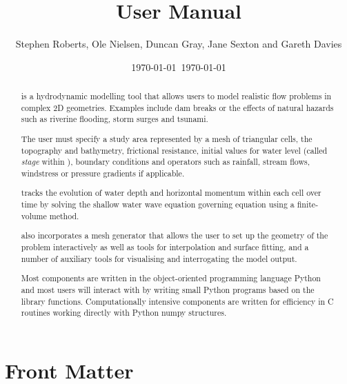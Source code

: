 \documentclass{manual}
\title{\anuga User Manual}
\author{Stephen Roberts, Ole Nielsen, Duncan Gray, Jane Sexton and Gareth Davies}
\date{\today \ \currenttime}
\date{\today} %
\begin{document}
\maketitle

\ifhtml
  \chapter*{Front Matter\label{front}}
\fi

%



\begin{abstract}
\label{def:anuga}

\noindent \anuga\index{\anuga} is a hydrodynamic modelling tool that
allows users to model realistic flow problems in complex 2D geometries.
Examples include dam breaks or the effects of natural hazards such
as riverine flooding, storm surges and tsunami.

The user must specify a study area represented by a mesh of triangular
cells, the topography and bathymetry, frictional resistance, initial
values for water level (called \emph{stage} within \anuga),
boundary conditions and operators such as rainfall, 
stream flows, windstress or pressure gradients if applicable.

\anuga tracks the evolution of water depth and horizontal momentum
within each cell over time by solving the shallow water wave equation
governing equation using a finite-volume method.

\anuga also incorporates a mesh generator that
allows the user to set up the geometry of the problem interactively as
well as tools for interpolation and surface fitting, and a number of
auxiliary tools for visualising and interrogating the model output.

Most \anuga components are written in the object-oriented programming
language Python and most users will interact with \anuga by writing
small Python programs based on the \anuga library
functions. Computationally intensive components are written for
efficiency in C routines working directly with Python numpy structures.

\end{abstract}

\tableofcontents
\end{document}

